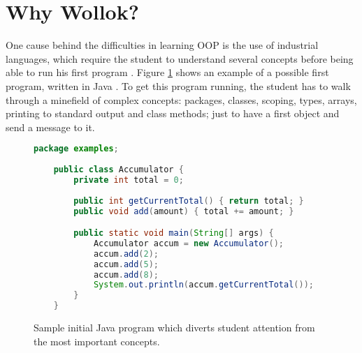 \section{Why Wollok?}
\label{sec:problem}


One cause behind the difficulties in learning OOP is the use of industrial languages, which require the student to understand several concepts before being able to run his first program \cite{kolling_problem_1999}.
Figure \ref{fig:helloWorld} shows an example of a possible first program, written in Java \cite{arnold_java_1996}.
To get this program running, the student has to walk through a minefield of complex concepts: packages, classes, scoping, types, arrays, printing to standard output and class methods; just to have a first object and send a message to it.

\vspace{-3mm}
\begin{figure}[ht]
 \centering
 \begin{lstlisting}[language=Java]
	package examples;
	
	public class Accumulator {
		private int total = 0;
		
		public int getCurrentTotal() { return total; }
		public void add(amount) { total += amount; }

		public static void main(String[] args) {
			Accumulator accum = new Accumulator();
			accum.add(2);
			accum.add(5);
			accum.add(8);
			System.out.println(accum.getCurrentTotal());
		}
	}\end{lstlisting}
\vspace{-3mm}
\caption{\small Sample initial Java program which diverts student attention from the most important concepts.}
\label{fig:helloWorld}
\end{figure}

